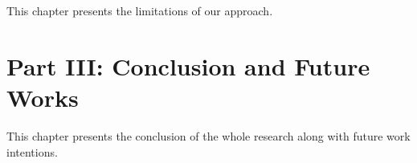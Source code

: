   \vspace{1mm}

\noindent  This chapter presents the limitations of our approach.

\section*{Part III: Conclusion and Future Works}

  \vspace{1mm}

\noindent  This chapter presents the conclusion of the whole research along with future work intentions.